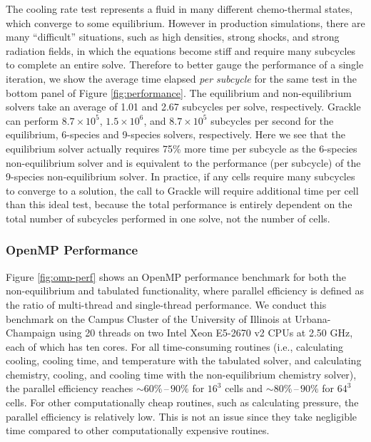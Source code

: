 The cooling rate test represents a fluid in many different
chemo-thermal states, which converge to some equilibrium.  However in
production simulations, there are many ``difficult'' situations, such
as high densities, strong shocks, and strong radiation fields, in
which the equations become stiff and require many subcycles to
complete an entire solve.  Therefore to better gauge the performance
of a single iteration, we show the average time elapsed {\it per
  subcycle} for the same test in the bottom panel of Figure
\ref{fig:performance}.  The equilibrium and non-equilibrium solvers
take an average of 1.01 and 2.67 subcycles per solve, respectively.
Grackle can perform $8.7 \times 10^5$, $1.5 \times 10^6$, and $8.7
\times 10^5$ subcycles per second for the equilibrium, 6-species and
9-species solvers, respectively.  Here we see that the equilibrium
solver actually requires 75\% more time per subcycle as the 6-species
non-equilibrium solver and is equivalent to the performance (per
subcycle) of the 9-species non-equilibrium solver.  In practice, if
any cells require many subcycles to converge to a solution, the call
to Grackle will require additional time per cell than this ideal test,
because the total performance is entirely dependent on the total
number of subcycles performed in one solve, not the number of cells.

\subsubsection{OpenMP Performance}


Figure \ref{fig:omp-perf} shows an OpenMP performance benchmark for both the
non-equilibrium and tabulated functionality, where parallel efficiency is
defined as the ratio of multi-thread and single-thread performance. We
conduct this benchmark on the Campus Cluster of the University of Illinois
at Urbana-Champaign using 20 threads on two Intel Xeon E5-2670 v2 CPUs
at 2.50 GHz, each of which has ten cores. For all time-consuming routines
(i.e., calculating cooling, cooling time, and temperature with the tabulated
solver, and calculating chemistry, cooling, and cooling time with the
non-equilibrium chemistry solver), the parallel efficiency reaches
$\sim 60\%\,\text{--}\,90\%$ for $16^3$ cells and
$\sim 80\%\,\text{--}\,90\%$ for $64^3$ cells. For other computationally cheap
routines, such as calculating pressure, the parallel efficiency is relatively
low. This is not an issue since they take negligible time compared to other
computationally expensive routines.

